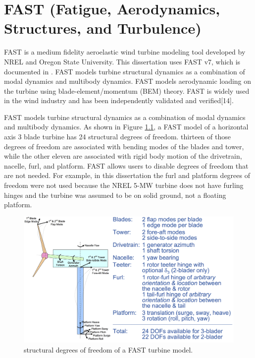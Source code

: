 
\chapter{FAST (Fatigue, Aerodynamics, Structures, and Turbulence) } %

\label{AppendixA} %


FAST is a medium fidelity aeroelastic wind turbine modeling tool developed by NREL and Oregon State University. This dissertation uses FAST v7, which is documented in \cite{jonkman2005,jonkman2013a,jonkman2013}. FAST models turbine structural dynamics as a combination of modal dynamics and multibody dynamics. FAST models aerodynamic loading on the turbine using blade-element/momentum (BEM) theory. FAST is widely used in the wind industry and has been independently validated and verified[14].

FAST models turbine structural dynamics as a combination of modal dynamics and multibody dynamics. As shown in Figure \ref{figA-1}, a FAST model of a horizontal axis 3 blade turbine has 24 structural degrees of freedom. thirteen of those degrees of freedom are associated with bending modes of the blades and tower, while the other eleven are associated with rigid body motion of the drivetrain, nacelle, furl, and platform. FAST allows users to disable degrees of freedom that are not needed. For example, in this dissertation the furl and platform degrees of freedom were not used because the NREL 5-MW turbine does not have furling hinges and the turbine was assumed to be on solid ground, not a floating platform. 

\begin{figure}[ht]
	\centering
		\includegraphics[width=\linewidth]{Figures/AppendixAFigures/figA-1.png}
	\caption{structural degrees of freedom of a FAST turbine model.\cite{jonkman2013}}
	\label{figA-1}
\end{figure}


